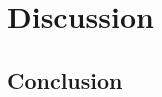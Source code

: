 \documentclass[draft]{agujournal2019}
\begin{document}





\section{Discussion}\label{sec:discussion}




\subsection{Conclusion}\label{sec:conclusion}




\end{document}
